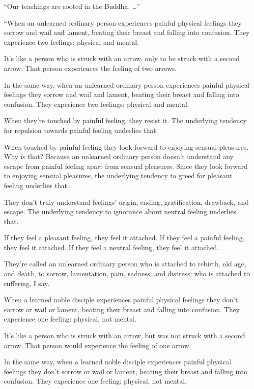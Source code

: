 \documentclass[12pt,openany]{book}%
\begin{document}
“Our teachings are rooted in the Buddha. …” 

“When an unlearned ordinary person experiences painful physical feelings they sorrow and wail and lament, beating their breast and falling into confusion. They experience two feelings: physical and mental. 

It’s like a person who is struck with an arrow, only to be struck with a second arrow. That person experiences the feeling of two arrows. 

In the same way, when an unlearned ordinary person experiences painful physical feelings they sorrow and wail and lament, beating their breast and falling into confusion. They experience two feelings: physical and mental. 

When they’re touched by painful feeling, they resist it. The underlying tendency for repulsion towards painful feeling underlies that. 

When touched by painful feeling they look forward to enjoying sensual pleasures. Why is that? Because an unlearned ordinary person doesn’t understand any escape from painful feeling apart from sensual pleasures. Since they look forward to enjoying sensual pleasures, the underlying tendency to greed for pleasant feeling underlies that. 

They don’t truly understand feelings’ origin, ending, gratification, drawback, and escape. The underlying tendency to ignorance about neutral feeling underlies that. 

If they feel a pleasant feeling, they feel it attached. If they feel a painful feeling, they feel it attached. If they feel a neutral feeling, they feel it attached. 

They’re called an unlearned ordinary person who is attached to rebirth, old age, and death, to sorrow, lamentation, pain, sadness, and distress; who is attached to suffering, I say. 

When a learned noble disciple experiences painful physical feelings they don’t sorrow or wail or lament, beating their breast and falling into confusion. They experience one feeling: physical, not mental. 

It’s like a person who is struck with an arrow, but was not struck with a second arrow. That person would experience the feeling of one arrow. 

In the same way, when a learned noble disciple experiences painful physical feelings they don’t sorrow or wail or lament, beating their breast and falling into confusion. They experience one feeling: physical, not mental. 
\end{document}
